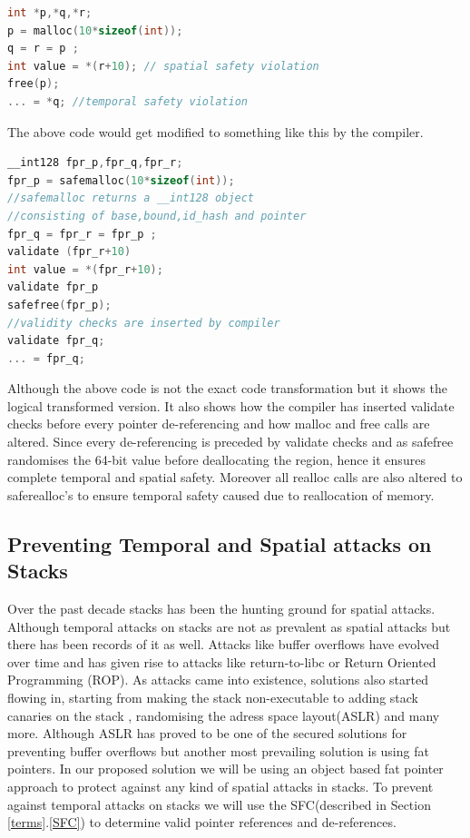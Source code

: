 \begin{lstlisting}[language=C]
int *p,*q,*r;
p = malloc(10*sizeof(int));
q = r = p ;
int value = *(r+10); // spatial safety violation
free(p);
... = *q; //temporal safety violation
\end{lstlisting}
The above code would get modified to something like this by the compiler.

\begin{lstlisting}[language=C]
__int128 fpr_p,fpr_q,fpr_r;
fpr_p = safemalloc(10*sizeof(int)); 
//safemalloc returns a __int128 object
//consisting of base,bound,id_hash and pointer
fpr_q = fpr_r = fpr_p ;
validate (fpr_r+10) 
int value = *(fpr_r+10); 
validate fpr_p 
safefree(fpr_p);
//validity checks are inserted by compiler
validate fpr_q;
... = fpr_q; 
\end{lstlisting}

Although the above code is not the exact code transformation but it shows the logical transformed version. It also shows how the compiler has inserted validate checks before every pointer de-referencing and how malloc and free calls are altered. Since every de-referencing is preceded by validate checks and as safefree randomises the 64-bit value before deallocating the region, hence it ensures complete temporal and spatial safety. Moreover all realloc calls are also altered to saferealloc's to ensure temporal safety caused due to reallocation of memory.

\subsection{Preventing Temporal and Spatial attacks on Stacks}

Over the past decade stacks has been the hunting ground for spatial attacks. Although temporal attacks on stacks are not as prevalent as spatial attacks but there has been records of it as well. Attacks like buffer overflows have evolved over time and has given rise to attacks like return-to-libc\cite{ReturnToLibC} or Return Oriented Programming (ROP)\cite{ROP}. As attacks came into existence, solutions also started flowing in, starting from making the stack non-executable\cite{NonExecStack} to adding stack canaries\cite{StackCanaries} on the stack , randomising the adress space layout(ASLR)\cite{ASLR} and many more. Although ASLR has proved to be one of the secured solutions for preventing buffer overflows but another most prevailing solution is using fat pointers. In our proposed solution we will be using an object based fat pointer approach to protect against any kind of spatial attacks in stacks. To prevent against temporal attacks on stacks we will use the SFC(described in Section \ref{terms}.\ref{SFC}) to determine valid pointer references and de-references.


